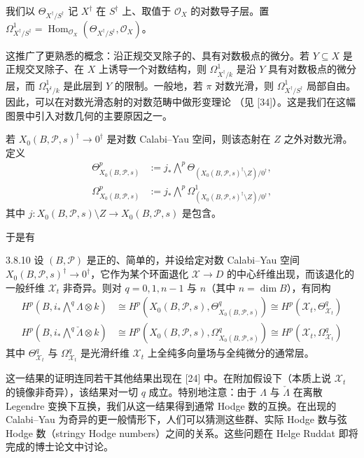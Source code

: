我们以 $\Theta_{X^\dagger/S^\dagger}$ 记 $X^\dagger$ 在 $S^\dagger$ 上、取值于 $\mathcal O_X$ 的对数导子层。置 $\Omega^1_{X^\dagger/S^\dagger}=\operatorname{Hom}_{\mathcal O_X}(\Theta_{X^\dagger/S^\dagger},\mathcal O_X)$。

这推广了更熟悉的概念：沿正规交叉除子的、具有对数极点的微分。若 $Y\subseteq X$ 是正规交叉除子、在 $X$ 上诱导一个对数结构，则 $\Omega^1_{X^\dagger/k}$ 是沿 $Y$ 具有对数极点的微分层，而 $\Omega^1_{Y^\dagger/k}$ 是此层到 $Y$ 的限制。一般地，若 $\pi$ 对数光滑，则 $\Omega^1_{X^\dagger/S^\dagger}$ 局部自由。因此，可以在对数光滑态射的对数范畴中做形变理论
（见 [34]）。这是我们在这幅图景中引入对数几何的主要原因之一。

若 $X_0(B,\mathcal P,s)^\dagger\to0^\dagger$ 是对数 Calabi--Yau 空间，则该态射在 $Z$ 之外对数光滑。定义
\[
\begin{aligned}
\Theta^p_{X_0(B,\mathcal P,s)}&:=j_*\bigwedge^p\Theta_{(X_0(B,\mathcal P,s)^\dagger\setminus Z)/0^\dagger},\\
\Omega^p_{X_0(B,\mathcal P,s)}&:=j_*\bigwedge^p\Omega^1_{(X_0(B,\mathcal P,s)^\dagger\setminus Z)/0^\dagger},
\end{aligned}
\]
其中 $j:X_0(B,\mathcal P,s)\setminus Z\to X_0(B,\mathcal P,s)$ 是包含。

于是有

\begin{theorem}{3.8.10}
设 $(B,\mathcal P)$ 是正的、简单的，并设给定对数 Calabi--Yau 空间 $X_0(B,\mathcal P,s)^\dagger\to0^\dagger$，它作为某个环面退化 $\mathcal X\to D$ 的中心纤维出现，而该退化的一般纤维 $\mathcal X_t$ 非奇异。则对 $q=0,1,n-1$ 与 $n$（其中 $n=\dim B$），有同构
\[
\begin{aligned}
H^p(B,i_*\bigwedge\nolimits^q\Lambda\otimes k)&\cong H^p(X_0(B,\mathcal P,s),\Theta^q_{X_0(B,\mathcal P,s)})\cong H^p(\mathcal X_t,\Theta^q_{\mathcal X_t})\\
H^p(B,i_*\bigwedge\nolimits^q\check\Lambda\otimes k)&\cong H^p(X_0(B,\mathcal P,s),\Omega^q_{X_0(B,\mathcal P,s)})\cong H^p(\mathcal X_t,\Omega^q_{\mathcal X_t})
\end{aligned}
\]
其中 $\Theta^q_{\mathcal X_t}$ 与 $\Omega^q_{\mathcal X_t}$ 是光滑纤维 $\mathcal X_t$ 上全纯多向量场与全纯微分的通常层。
\end{theorem}

这一结果的证明连同若干其他结果出现在 [24] 中。在附加假设下（本质上说 $\mathcal X_t$ 的镜像非奇异），该结果对一切 $q$ 成立。特别地注意：由于 $\Lambda$ 与 $\check\Lambda$ 在离散 Legendre 变换下互换，我们从这一结果得到通常 Hodge 数的互换。在出现的 Calabi--Yau 为奇异的更一般情形下，人们可以猜测这些群、实际 Hodge 数与弦 Hodge 数（stringy Hodge numbers）之间的关系。这些问题在 Helge Ruddat 即将完成的博士论文中讨论。

